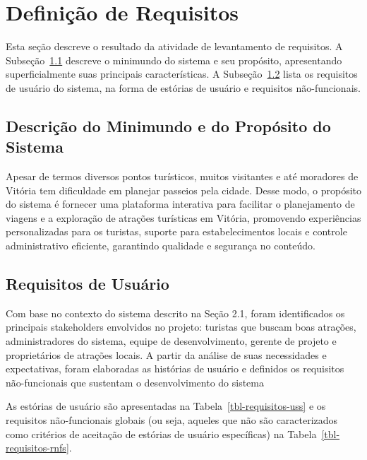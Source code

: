 \chapter{Definição de Requisitos}
\label{sec-requisitos}
\vspace{-1cm}

Esta seção descreve o resultado da atividade de levantamento de requisitos.
A Subseção~\ref{sec-requisitos-minimundo} descreve o minimundo do sistema e seu propósito, apresentando superficialmente suas principais características. 
A Subseção~\ref{sec-requisitos-usuario} lista os requisitos de usuário do sistema, na forma de estórias de usuário e requisitos não-funcionais. 




\section{Descrição do Minimundo e do Propósito do Sistema}
\label{sec-requisitos-minimundo}

Apesar de termos diversos pontos turísticos, muitos visitantes e até moradores de Vitória tem dificuldade em planejar passeios pela cidade. Desse modo, o propósito do sistema é fornecer uma plataforma interativa para facilitar o planejamento de viagens e a exploração de atrações turísticas em Vitória, promovendo experiências personalizadas para os turistas, suporte para estabelecimentos locais e controle administrativo eficiente, garantindo qualidade e segurança no conteúdo.



\section{Requisitos de Usuário}
\label{sec-requisitos-usuario}

Com base no contexto do sistema descrito na Seção 2.1, foram identificados os principais stakeholders envolvidos no projeto: turistas que buscam boas atrações, administradores do sistema, equipe de desenvolvimento, gerente de projeto e proprietários de atrações locais. A partir da análise de suas necessidades e expectativas, foram elaboradas as histórias de usuário e definidos os requisitos não-funcionais que sustentam o desenvolvimento do sistema

As estórias de usuário são apresentadas na Tabela~\ref{tbl-requisitos-uss} e os requisitos não-funcionais globais (ou seja, aqueles que não são caracterizados como critérios de aceitação de estórias de usuário específicas) na Tabela~\ref{tbl-requisitos-rnfs}.

